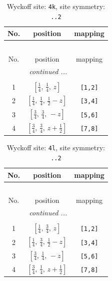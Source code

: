 \documentclass[fleqn,8pt]{jsarticle}
\begin{document}
\renewcommand{\arraystretch}{1.2}
\begin{longtable}{ccc}
\caption{Wyckoff site: {\tt 4k}, site symmetry: {\tt ..2}}
 \\
 \hline \hline
No. & position & mapping \\ \hline \endfirsthead

\multicolumn{2}{l}{\tablename\ \thetable{}} \\
 \hline \hline
No. & position & mapping \\ \hline \endhead

 \hline \hline
\multicolumn{2}{r}{\footnotesize\it continued ...} \\ \endfoot

 \hline \hline
\multicolumn{2}{r}{} \\ \endlastfoot

1 & $\left[ \frac{1}{4},\, \frac{1}{4},\, z \right]$ & {\tt [1,2]} \\ \hline
2 & $\left[ \frac{1}{4},\, \frac{1}{4},\, \frac{1}{2} - z \right]$ & {\tt [3,4]} \\ \hline
3 & $\left[ \frac{3}{4},\, \frac{3}{4},\, - z \right]$ & {\tt [5,6]} \\ \hline
4 & $\left[ \frac{3}{4},\, \frac{3}{4},\, z + \frac{1}{2} \right]$ & {\tt [7,8]} \\
\end{longtable}
\renewcommand{\arraystretch}{1.2}
\begin{longtable}{ccc}
\caption{Wyckoff site: {\tt 4l}, site symmetry: {\tt ..2}}
 \\
 \hline \hline
No. & position & mapping \\ \hline \endfirsthead

\multicolumn{2}{l}{\tablename\ \thetable{}} \\
 \hline \hline
No. & position & mapping \\ \hline \endhead

 \hline \hline
\multicolumn{2}{r}{\footnotesize\it continued ...} \\ \endfoot

 \hline \hline
\multicolumn{2}{r}{} \\ \endlastfoot

1 & $\left[ \frac{1}{4},\, \frac{3}{4},\, z \right]$ & {\tt [1,2]} \\ \hline
2 & $\left[ \frac{1}{4},\, \frac{3}{4},\, \frac{1}{2} - z \right]$ & {\tt [3,4]} \\ \hline
3 & $\left[ \frac{3}{4},\, \frac{1}{4},\, - z \right]$ & {\tt [5,6]} \\ \hline
4 & $\left[ \frac{3}{4},\, \frac{1}{4},\, z + \frac{1}{2} \right]$ & {\tt [7,8]} \\
\end{longtable}
\end{document}
